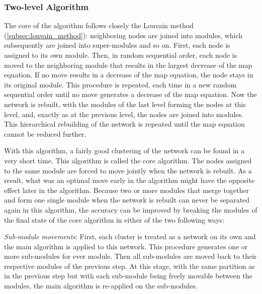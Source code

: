 {\subsubsection*{Two-level Algorithm}\label{subsubsec:two_level_algorithm}
The core of the algorithm follows closely the Louvain method (\ref{subsec:louvain_method}): neighboring nodes are joined into modules, which subsequently are joined into super-modules and so on. First, each node is assigned to its own module. Then, in random sequential order, each node is moved to the neighboring module that results in the largest decrease of the map equation. If no move results in a decrease of the map equation, the node stays in its original module. This procedure is repeated, each time in a new random sequential order until no move generates a decrease of the map equation. Now the network is rebuilt, with the modules of the last level forming the nodes at this level, and, exactly as at the previous level, the nodes are joined into modules. This hierarchical rebuilding of the network is repeated until the map equation cannot be reduced further.

With this algorithm, a fairly good clustering of the network can be found in a very short time. This algorithm is called the core algorithm. The nodes assigned to the same module are forced to move jointly when the network is rebuilt. As a result, what was an optimal move early in the algorithm might have the opposite effect later in the algorithm. Because two or more modules that merge together and form one single module when the network is rebuilt can never be separated again in this algorithm, the accuracy can be improved by breaking the modules of the final state of the core algorithm in either of the two following ways:

\textit{Sub-module movements}: First, each cluster is treated as a network on its own and the main algorithm is applied to this network. This procedure generates one or more sub-modules for ever module. Then all sub-modules are moved back to their respective modules of the previous step. At this stage, with the same partition as in the previous step but with each sub-module being freely movable between the modules, the main algorithm is re-applied on the sub-modules.

}
